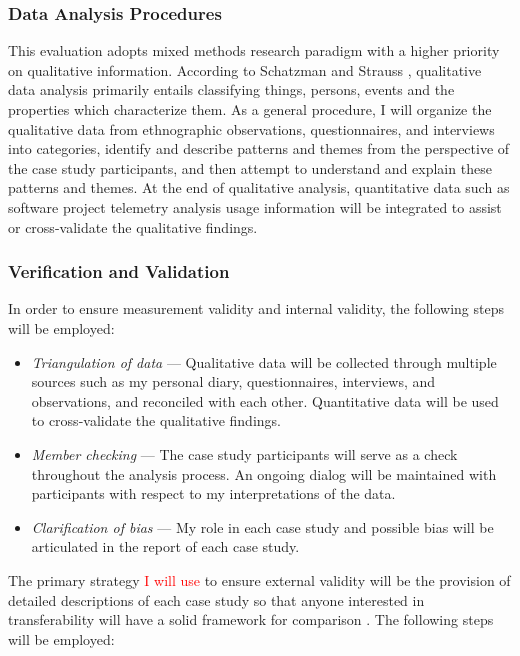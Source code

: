\subsubsection{Data Analysis Procedures}

This evaluation adopts mixed methods research paradigm with a higher priority on qualitative information. According to Schatzman and Strauss \cite{Schatzman:1973}, qualitative data analysis primarily entails classifying things, persons, events and the properties which characterize them. As a general procedure, I will organize the qualitative data from ethnographic observations, questionnaires, and interviews into categories, identify and describe patterns and themes from the perspective of the case study participants, and then attempt to understand and explain these patterns and themes. At the end of qualitative analysis, quantitative data such as software project telemetry analysis usage information will be integrated to assist or cross-validate the qualitative findings.



\subsubsection{Verification and Validation}

In order to ensure measurement validity and internal validity, the following steps will be employed:

\begin{itemize}
	\item \textit{Triangulation of data} --- Qualitative data will be collected through multiple sources such as my personal diary, questionnaires, interviews, and observations, and reconciled with each other. Quantitative data will be used to cross-validate the qualitative findings.
	
	\item \textit{Member checking} --- The case study participants will serve as a check throughout the analysis process. An ongoing dialog will be maintained with participants with respect to my interpretations of the data.
	
	\item \textit{Clarification of bias} --- My role in each case study and possible bias will be articulated in the report of each case study.
	
\end{itemize}




The primary strategy \textcolor{red}{I will use} to ensure external validity will be the provision of detailed descriptions of each case study so that anyone interested in transferability will have a solid framework for comparison \cite{Merriam:1998}. The following steps will be employed:

